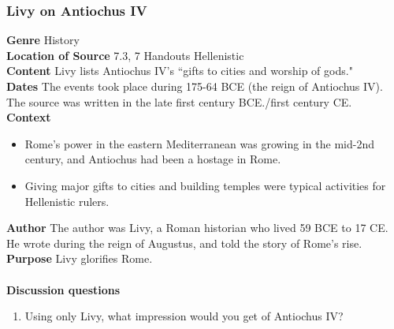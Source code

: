 \documentclass{article}
\begin{document}
\subsubsection*{Livy on Antiochus IV}
\textbf{Genre}
History \\
\textbf{Location of Source}
7.3, 7 Handouts Hellenistic \\
\textbf{Content}
Livy lists Antiochus IV’s “gifts to cities and worship of gods." \\
\textbf{Dates}
The events took place during 175-64 BCE (the reign of Antiochus IV).  The source was written in the late first century BCE./first century CE. \\
\textbf{Context}
\begin{itemize}
  \item Rome’s power in the eastern Mediterranean was growing in the mid-2nd century, and Antiochus had been a hostage in Rome.
  \item Giving major gifts to cities and building temples were typical activities for Hellenistic rulers.
\end{itemize}
\textbf{Author}
The author was Livy,  a Roman historian who lived 59 BCE to 17 CE. He wrote during the reign of Augustus, and told the story of Rome’s rise. \\
\textbf{Purpose}
Livy glorifies Rome. \\
\\
\textbf{Discussion questions}
\begin{enumerate}
  \item Using only Livy, what impression would you get of Antiochus IV?
\end{enumerate}
\end{document}
